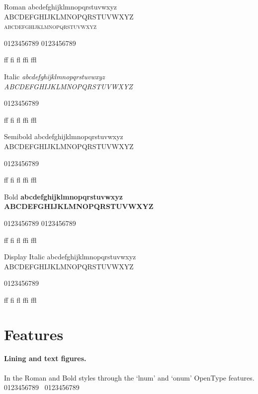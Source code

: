 \documentclass{scrartcl}
\begin{document}
\begin{english}
{\begin{style}{Roman}
abcdefghijklmnopqrstuvwxyz \\
ABCDEFGHIJKLMNOPQRSTUVWXYZ \\
\textsc{abcdefghijklmnopqrstuvwxyz}

0123456789 \newline
{}
0123456789

ff fi fl ffi ffl
\end{style}


\begin{style}{Italic}\it
abcdefghijklmnopqrstuvwxyz \\
ABCDEFGHIJKLMNOPQRSTUVWXYZ

0123456789

ff fi fl ffi ffl
\end{style}


\begin{style}{Semibold}\semibold
abcdefghijklmnopqrstuvwxyz \\
ABCDEFGHIJKLMNOPQRSTUVWXYZ

0123456789

ff fi fl ffi ffl
\end{style}


\begin{style}{Bold}\bf
abcdefghijklmnopqrstuvwxyz \\
ABCDEFGHIJKLMNOPQRSTUVWXYZ

0123456789 \newline
{}
0123456789

ff fi fl ffi ffl
\end{style}


\begin{style}{Display Italic}\dispital
abcdefghijklmnopqrstuvwxyz \\
ABCDEFGHIJKLMNOPQRSTUVWXYZ

0123456789

ff fi fl ffi ffl
\end{style}
}

\clearpage
\section{Features}

\paragraph{Lining and text figures.} In the Roman and Bold styles through the ‘lnum’ and ‘onum’ OpenType features. { 0123456789}~{ 0123456789}


\end{english}
\end{document}
